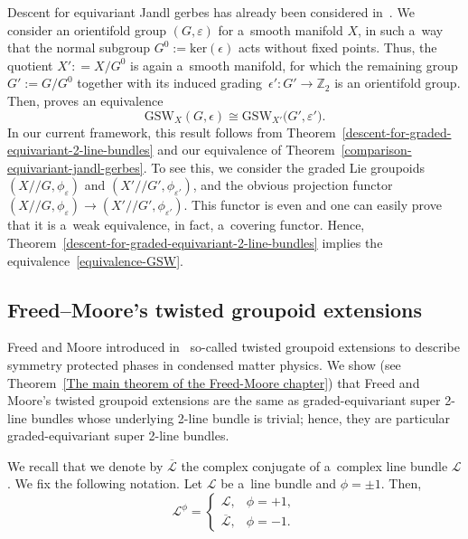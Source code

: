 \documentclass[10pt,a4paper]{amsart}
\numberwithin{equation}{section}
\def\Z {\mathbb{Z}}
\def\act#1#2{#1/\!\!/#2}
\begin{document}
\begin{Remark}
Descent for equivariant Jandl gerbes has already been considered in~\cite{gawedzki8}.
We consider an orientifold group $(G,\varepsilon)$ for a~smooth manifold $X$, in such a~way that the normal subgroup $G^{0}:=\mathrm{ker}(\epsilon)$ acts without fixed points. Thus, the quotient $X': =X/G^{0}$ is again a~smooth manifold, for which the remaining group $G':=G/G^{0}$ together with its induced grading~${\epsilon'\colon G' \to \Z_2}$ is an orientifold group. Then, \cite[Theorem~3.1]{gawedzki8} proves an equivalence
\begin{equation}
\label{equivalence-GSW}
\mathrm{GSW}_X(G,\epsilon)\cong \mathrm{GSW}_{X'}\bigl(G',\varepsilon'\bigr).
\end{equation}
In our current framework, this result follows from Theorem~\ref{descent-for-graded-equivariant-2-line-bundles} and our equivalence of Theorem~\ref{comparison-equivariant-jandl-gerbes}.
To see this, we consider the graded Lie groupoids $(\act XG,\phi_\varepsilon)$ and $(\act {X'}{G'},\phi_{\varepsilon'})$, and the obvious projection functor
$
(\act XG,\phi_\varepsilon) \to (\act {X'}{G'},\phi_{\varepsilon'})$.
This functor is even and one can easily prove that it is a~weak equivalence, in fact, a~covering functor. Hence, Theorem~\ref{descent-for-graded-equivariant-2-line-bundles} implies the equivalence~\eqref{equivalence-GSW}. \end{Remark}


\subsection{Freed--Moore's twisted groupoid extensions}
\label{freed-moore-extensions}


Freed and Moore introduced in~\cite{Freeda} so-called twisted groupoid extensions to describe symmetry protected phases in condensed matter physics.
We show (see Theorem~\ref{The main theorem of the Freed-Moore chapter}) that Freed and Moore's twisted groupoid extensions are the same as
graded-equivariant super 2-line bundles whose underlying 2-line bundle is trivial; hence, they are particular graded-equivariant super 2-line bundles.

We recall that we denote by $\overline{\mathcal{L}}$ the complex conjugate of a~complex line bundle $\mathcal{L}$.
We fix the following notation. Let $\mathcal{L}$ be a~line bundle and $\phi=\pm 1$. Then,
\begin{equation} \label{complex conjugation according to sign}
 \mathcal{L}^\phi = \begin{cases}
 \mathcal{L}, & \phi = +1, \\
 \overline{\mathcal{L}}, & \phi = -1.
 \end{cases}
\end{equation}
\end{document}
